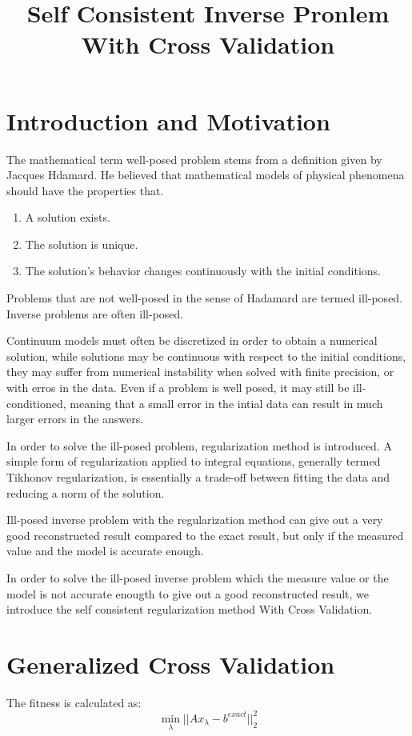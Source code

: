 \documentclass{article}
\begin{document}
\title{Self Consistent Inverse Pronlem With Cross Validation}
\maketitle

\section{Introduction and Motivation}
The mathematical term well-posed problem stems from a definition given by
Jacques Hdamard. He believed that mathematical models of physical phenomena
should have the properties that.
\begin{enumerate} 
  \item A solution exists.
  \item The solution is unique.
  \item The solution's behavior changes continuously with the initial
  conditions.
\end{enumerate}
Problems that are not well-posed in the sense
of Hadamard are termed ill-posed. Inverse problems are often ill-posed.

Continuum models must often be discretized in order to obtain a numerical
solution, while solutions may be continuous with respect to the initial
conditions, they may suffer from numerical instability when solved with finite
precision, or with erros in the data. Even if a problem is well posed, it may
still be ill-conditioned, meaning that a small error in the intial data can
result in much larger errors in the answers.

In order to solve the ill-posed problem, regularization method is introduced. A
simple form of regularization applied to integral equations, generally termed
Tikhonov regularization, is essentially a trade-off between fitting the data and
reducing a norm of the solution. 

Ill-posed inverse problem with the regularization method can give out a very
good reconstructed result compared to the exact result, but only if the measured
value and the model is accurate enough.

In order to solve the ill-posed inverse problem which the measure value or the 
model is not accurate enougth to give out a good reconstructed result, we
introduce the self consistent regularization method With Cross Validation.


\section{Generalized Cross Validation}
The fitness is calculated as:
\begin{equation}
	\mathop {\min }\limits_\lambda  ||A{x_\lambda } - {b^{exact}}||_2^2
\end{equation}
\end{document}
